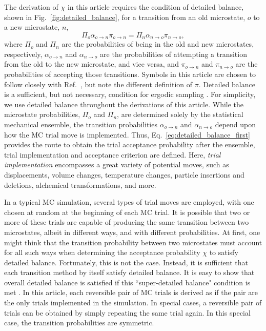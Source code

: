\documentclass[
  9pt,
  bestpractices,
]{livecoms}
\begin{document}
The derivation of $\chi$ in this article requires the condition of detailed balance, shown in Fig.~\ref{fig:detailed_balance}, for a transition from an old microstate, $o$ to a new microstate, $n$,
\begin{equation}
\Pi_o\alpha_{o\rightarrow n}\pi_{o\rightarrow n} = \Pi_n\alpha_{n\rightarrow o}\pi_{n\rightarrow o},
\label{eq:detailed_balance_first}
\end{equation}
where $\Pi_o$ and $\Pi_n$ are the probabilities of being in the old and new microstates, respectively, $\alpha_{o\rightarrow n}$ and $\alpha_{n\rightarrow o}$ are the probabilities of attempting a transition from the old to the new microstate, and vice versa, and $\pi_{o\rightarrow n}$ and $\pi_{n\rightarrow o}$ are the probabilities of accepting those transitions.
Symbols in this article are chosen to follow closely with Ref.~\cite{frenkel_understanding_2002}, but note the different definition of $\pi$.
Detailed balance is a sufficient, but not necessary, condition for ergodic sampling \cite{manousiouthakis_strict_1999}.
For simplicity, we use detailed balance throughout the derivations of this article.
While the microstate probabilities, $\Pi_o$ and $\Pi_n$, are determined solely by the statistical mechanical ensemble, the transition probabilities $\alpha_{o\rightarrow n}$ and $\alpha_{n\rightarrow o}$ depend upon how the MC trial move is implemented.
Thus, Eq.~\ref{eq:detailed_balance_first} provides the route to obtain the trial acceptance probability after the ensemble, trial implementation and acceptance criterion are defined.
Here, \emph{trial implementation} encompasses a great variety of potential moves, such as displacements, volume changes, temperature changes, particle insertions and deletions, alchemical transformations, and more.

In a typical MC simulation, several types of trial moves are employed, with one chosen at random at the beginning of each MC trial.
It is possible that two or more of these trials are capable of producing the same transition between two microstates, albeit in different ways, and with different probabilities.
At first, one might think that the transition probability between two microstates must account for all such ways when determining the acceptance probability $\chi$ to satisfy detailed balance.
Fortunately, this is not the case.
Instead, it is sufficient that each transition method by itself satisfy detailed balance.
It is easy to show that overall detailed balance is satisfied if this ``super-detailed balance" condition is met \cite{frenkel_speed-up_2004}.
In this article, each reversible pair of MC trials is derived as if the pair are the only trials implemented in the simulation.
In special cases, a reversible pair of trials can be obtained by simply repeating the same trial again.
In this special case, the transition probabilities are symmetric.
\end{document}
